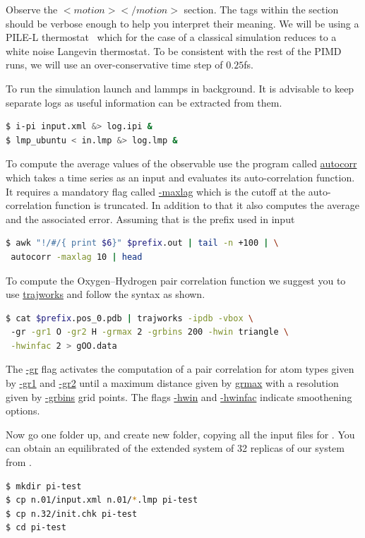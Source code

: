 \documentclass{article}
\begin{document}
\begin{Exercise}[label={water},title={Benchmark of quantum effects in a water molecule}]
\Question
Observe the \lstinxml$<motion></motion>$ section. The tags within the section should be 
verbose enough to help you interpret their meaning. We will be using a PILE-L thermostat~\cite{ceri+10jcp}
 which for the case of a classical simulation reduces to a white noise Langevin thermostat. 
To be consistent with the rest of the PIMD runs, we will use an over-conservative time step of $0.25$fs. 

\Question
To run the simulation launch \ipi{} and lammps in background. It is advisable to keep separate 
logs as useful information can be extracted from them.
\begin{lstlisting}[language=bash]
$ i-pi input.xml &> log.ipi &
$ lmp_ubuntu < in.lmp &> log.lmp &
\end{lstlisting}
To compute the average values of the observable use the program called \url{autocorr} which takes a time series as an input and evaluates its auto-correlation function. It requires a mandatory flag called \url{-maxlag} which is the cutoff at the auto-correlation function is truncated. In addition to that it also computes the average and the associated error. Assuming that  is the prefix used in \ipi{} input \begin{lstlisting}[language=bash]
$ awk "!/#/{ print $6}" $prefix.out | tail -n +100 | \
 autocorr -maxlag 10 | head
\end{lstlisting}

\Question
To compute the Oxygen--Hydrogen pair correlation function we suggest you to use \url{trajworks} and follow the syntax as shown.
\begin{lstlisting}[language=bash]
$ cat $prefix.pos_0.pdb | trajworks -ipdb -vbox \ 
 -gr -gr1 O -gr2 H -grmax 2 -grbins 200 -hwin triangle \
 -hwinfac 2 > gOO.data 
\end{lstlisting}
The \url{-gr} flag activates the computation of a pair correlation for atom types given by \url{-gr1} and \url{-gr2} until a maximum distance given by \url{grmax} with a resolution given by \url{-grbins} grid points. The flags \url{-hwin} and \url{-hwinfac} indicate smoothening options.

\Question
Now go one folder up, and create new folder, copying all the input files 
for . You can obtain an equilibrated 
of the extended system of 32 replicas of our system from 
\lstinbash{n.32/init.chk}.

\begin{lstlisting}[language=bash]
$ mkdir pi-test
$ cp n.01/input.xml n.01/*.lmp pi-test
$ cp n.32/init.chk pi-test
$ cd pi-test
\end{lstlisting}


\end{Exercise}
\end{document}
